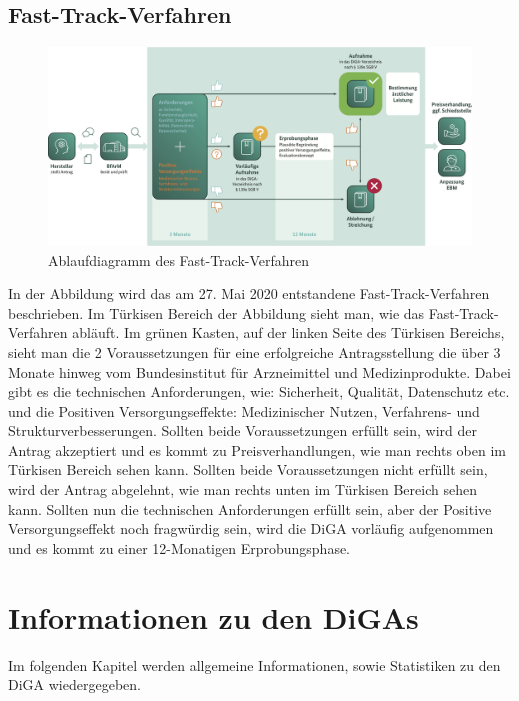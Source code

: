 \documentclass{article}
\begin{document}
		\subsection{Fast-Track-Verfahren} 
			\begin{figure}[htbp]
				\includegraphics[width=\textwidth]{./grafiken/fast-track-verfahren}
				\caption[Ablaufdiagramm des Fast-Track-Verfahren]{Ablaufdiagramm des Fast-Track-Verfahren}
				\label{Abb-ft-Verfahren}
			\end{figure}
			In der Abbildung wird das am 27. Mai 2020 entstandene Fast-Track-Verfahren beschrieben. Im Türkisen Bereich der Abbildung sieht man, wie das Fast-Track-Verfahren abläuft. Im grünen Kasten, auf der linken Seite des Türkisen Bereichs, sieht man die 2 Voraussetzungen für eine erfolgreiche Antragsstellung die über 3 Monate hinweg vom Bundesinstitut für Arzneimittel und Medizinprodukte. Dabei gibt es die technischen Anforderungen, wie: Sicherheit, Qualität, Datenschutz etc. und die Positiven Versorgungseffekte: Medizinischer Nutzen, Verfahrens- und Strukturverbesserungen. Sollten beide Voraussetzungen erfüllt sein, wird der Antrag akzeptiert und es kommt zu Preisverhandlungen, wie man rechts oben im Türkisen Bereich sehen kann. Sollten beide Voraussetzungen nicht erfüllt sein, wird der Antrag abgelehnt, wie man rechts unten im Türkisen Bereich sehen kann. Sollten nun die technischen Anforderungen erfüllt sein, aber der Positive Versorgungseffekt noch fragwürdig sein, wird die DiGA vorläufig aufgenommen und es kommt zu einer 12-Monatigen Erprobungsphase.
		\newpage
	\section{Informationen zu den DiGAs}   
		Im folgenden Kapitel werden allgemeine Informationen, sowie Statistiken zu den DiGA wiedergegeben.
\end{document}
